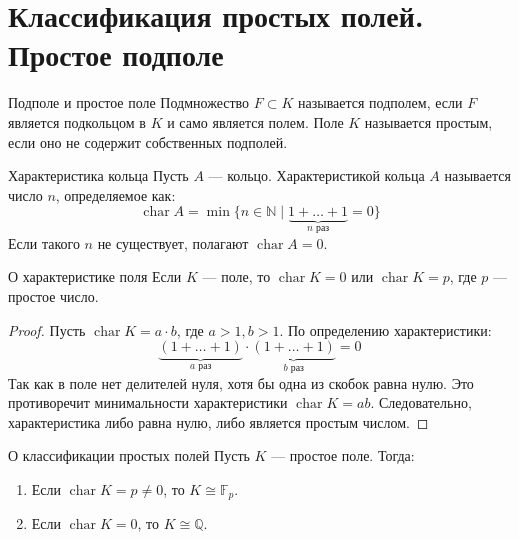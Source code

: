 
\section{Классификация простых полей. Простое подполе}

\begin{Definition}{Подполе и простое поле}{}
	Подмножество $F \subset K$ называется подполем, если $F$ является подкольцом в $K$ и само является полем.
	Поле $K$ называется простым, если оно не содержит собственных подполей.
\end{Definition}

\begin{Definition}{Характеристика кольца}{}
	Пусть $A$ --- кольцо. Характеристикой кольца $A$ называется число $n$, определяемое как:
	\[ \operatorname{char} A = \min \{n \in \mathbb{N} \mid \underbrace{1 + \dots + 1}_{n \text{ раз}} = 0\} \]
	Если такого $n$ не существует, полагают $\operatorname{char} A = 0$.
\end{Definition}

\begin{Lemma}{О характеристике поля}{}
	Если $K$ --- поле, то $\operatorname{char} K = 0$ или $\operatorname{char} K = p$, где $p$ --- простое число.
\end{Lemma}

\begin{proof}
	Пусть $\operatorname{char} K = a \cdot b$, где $a > 1, b > 1$. По определению характеристики:
	\[ \underbrace{(1 + \dots + 1)}_{a \text{ раз}} \cdot \underbrace{(1 + \dots + 1)}_{b \text{ раз}} = 0 \]
	Так как в поле нет делителей нуля, хотя бы одна из скобок равна нулю. Это противоречит минимальности характеристики $\operatorname{char} K = ab$. Следовательно, характеристика либо равна нулю, либо является простым числом.
\end{proof}

\begin{Theorem}{О классификации простых полей}{}
	Пусть $K$ --- простое поле. Тогда:
	\begin{enumerate}
		\item Если $\operatorname{char} K = p \neq 0$, то $K \cong \mathbb{F}_p$.
		\item Если $\operatorname{char} K = 0$, то $K \cong \mathbb{Q}$.
	\end{enumerate}
\end{Theorem}

